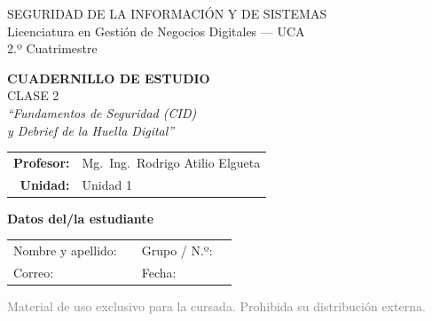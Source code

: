 \documentclass[12pt,a4paper]{article}
\begin{document}
\begin{titlepage}
\centering
\vspace*{1cm}

\begin{cajaTitulo}[width=\textwidth, halign=center]
  SEGURIDAD DE LA INFORMACIÓN Y DE SISTEMAS\\[4pt]
  {\large Licenciatura en Gestión de Negocios Digitales — UCA}\\[2pt]
  {\normalsize 2.º Cuatrimestre}
\end{cajaTitulo}

\vspace{1.5cm}

{\Huge\bfseries\color{azulUCA} CUADERNILLO DE ESTUDIO}\\[8pt]
{\LARGE\color{doradoUCA} CLASE 2}\\[12pt]
{\Large\itshape ``Fundamentos de Seguridad (CID)\\[2pt] y Debrief de la Huella Digital''}\\[1.5cm]

\begin{tabular}{rl}
\textbf{Profesor:}   & Mg.\ Ing.\ Rodrigo Atilio Elgueta \\[4pt]
\textbf{Unidad:}     & Unidad 1 \\[4pt]
\end{tabular}

\vfill

\begin{tcolorbox}[colback=grisClaro, colframe=azulUCA, arc=3mm, width=0.85\textwidth]
  \centering
  {\bfseries Datos del/la estudiante}\\[8pt]
  \begin{tabular}{p{5cm}l p{5cm}l}
    Nombre y apellido: & \underline{\hspace{4.8cm}} &
    Grupo / N.º: & \underline{\hspace{4.8cm}} \\[10pt]
    Correo: & \underline{\hspace{4.8cm}} &
    Fecha: & \underline{\hspace{4.8cm}} \\
  \end{tabular}
\end{tcolorbox}

\vspace{1cm}
{\small\textcolor{gray}{Material de uso exclusivo para la cursada. Prohibida su distribución externa.}}
\end{titlepage}
\end{document}
